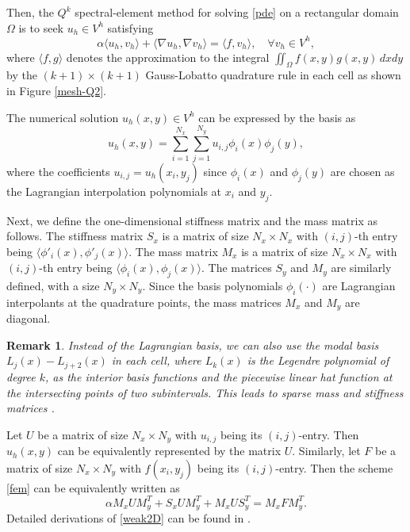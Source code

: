 \documentclass{article}
\newtheorem{remark}{Remark}
\begin{document}
 
 

Then, the $Q^k$ spectral-element method for solving \eqref{pde} on a rectangular domain $\Omega$ is to seek $u_h\in V^h$ satisfying
\begin{equation}
    \label{fem}
\alpha\langle u_h,  v_h \rangle+\langle \nabla u_h, \nabla v_h \rangle =
\langle f, v_h\rangle,\quad \forall v_h\in V^h,
\end{equation}
where $\langle f, g\rangle$ denotes the approximation to the integral $\iint_\Omega f(x,y) g(x,y) \, dx dy$ by the $(k+1)\times (k+1)$ Gauss-Lobatto quadrature rule in each cell as shown in Figure \ref{mesh-Q2}.




The numerical solution $u_h(x,y)\in V^h$  can be expressed by the basis as 
\begin{equation*}
    u_h(x,y) = \sum_{i=1}^{N_x}\sum_{j=1}^{N_y} u_{i,j}\phi_{i}(x)\phi_{j}(y),
\end{equation*}
where the coefficients $u_{i,j}=u_h(x_i,y_j)$ since $\phi_i(x)$ and $\phi_j(y)$ are chosen as the Lagrangian interpolation polynomials at $x_i$ and $y_j$. 


Next, we define the one-dimensional stiffness matrix and the mass matrix as follows. The stiffness matrix $S_x$ is a matrix of size $N_x\times N_x$ with $(i,j)$-th entry being $\langle \phi'_i(x), \phi'_j(x)\rangle$.
The mass matrix $M_x$ is a matrix of size $N_x\times N_x$ with $(i,j)$-th entry being $\langle  \phi_i(x),  \phi_j(x)\rangle$. 
The matrices $S_y$ and $M_y$ are similarly defined, with a size $N_y\times N_y$. Since the basis polynomials $\phi_i(\cdot)$ are Lagrangian interpolants at the quadrature points, the mass matrices $M_x$ and $M_y$ are diagonal. 

\begin{remark}
 Instead of the Lagrangian basis, we can also use the modal basis $L_j(x)-L_{j+2}(x)$ in each cell, where $L_k(x)$ is the Legendre polynomial of degree $k$,  as the interior basis functions  and the piecewise linear hat function at the intersecting points of two subintervals. This leads to sparse mass and stiffness matrices \cite{kwan2007efficient,ChenShen2012}.
\end{remark}
 
Let $U$ be a matrix of size $N_x\times N_y$ with $u_{i,j}$ being its $(i,j)$-entry. Then  $u_h(x,y)$ can be equivalently represented by the matrix $U$.
Similarly, let $F$ be a matrix of size $N_x\times N_y$ with $f(x_i, y_j)$ being its $(i,j)$-entry. 
Then the scheme  \eqref{fem} can be equivalently written as
\begin{equation}\label{weak2D}
    \alpha M_{x}UM^T_{y} + S_{x}UM^T_{y} + M_{x}US^T_{y} = M_{x} F M^T_{y}.
\end{equation}
Detailed derivations of \eqref{weak2D} can be found in \cite{li2020superconvergence,shen2022discrete, hu2023positivity}.
\end{document}
